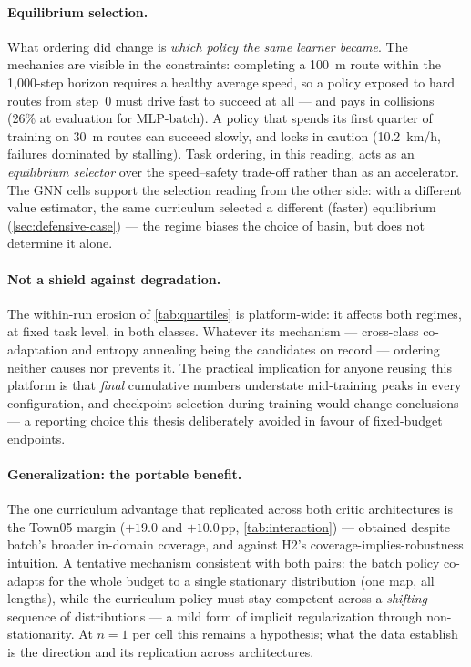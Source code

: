 \paragraph{Equilibrium selection.}
What ordering did change is \emph{which policy the same learner became}.
The mechanics are visible in the constraints: completing a \SI{100}{m}
route within the 1{,}000-step horizon requires a healthy average speed,
so a policy exposed to hard routes from step~0 must drive fast to
succeed at all --- and pays in collisions (26\% at evaluation for
MLP-batch). A policy that spends its first quarter of training on
\SI{30}{m} routes can succeed slowly, and locks in caution (10.2~km/h,
failures dominated by stalling). Task ordering, in this reading, acts as
an \emph{equilibrium selector} over the speed--safety trade-off rather
than as an accelerator. The GNN cells support the selection reading from
the other side: with a different value estimator, the same curriculum
selected a different (faster) equilibrium
(\cref{sec:defensive-case}) --- the regime biases the choice of basin,
but does not determine it alone.

\paragraph{Not a shield against degradation.}
The within-run erosion of \cref{tab:quartiles} is platform-wide: it
affects both regimes, at fixed task level, in both classes. Whatever its
mechanism --- cross-class co-adaptation and entropy annealing being the
candidates on record --- ordering neither causes nor prevents it. The
practical implication for anyone reusing this platform is that
\emph{final} cumulative numbers understate mid-training peaks in every
configuration, and checkpoint selection during training would change
conclusions --- a reporting choice this thesis deliberately avoided in
favour of fixed-budget endpoints.

\paragraph{Generalization: the portable benefit.}
The one curriculum advantage that replicated across both critic
architectures is the Town05 margin ($+19.0$ and $+10.0$\,pp,
\cref{tab:interaction}) --- obtained despite batch's broader in-domain
coverage, and against H2's coverage-implies-robustness intuition. A
tentative mechanism consistent with both pairs: the batch policy
co-adapts for the whole budget to a single stationary distribution
(one map, all lengths), while the curriculum policy must stay competent
across a \emph{shifting} sequence of distributions --- a mild form of
implicit regularization through non-stationarity. At $n{=}1$ per cell
this remains a hypothesis; what the data establish is the direction and
its replication across architectures.

